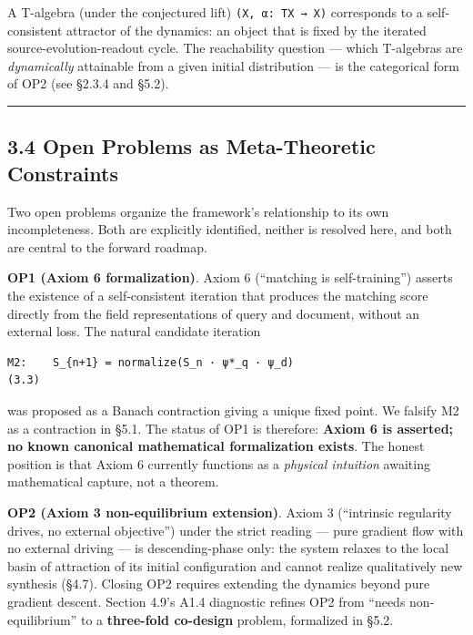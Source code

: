 \documentclass[
]{article}
\begin{document}
A T-algebra (under the conjectured lift) \texttt{(X,\ α:\ TX\ →\ X)}
corresponds to a self-consistent attractor of the dynamics: an object
that is fixed by the iterated source-evolution-readout cycle. The
reachability question --- which T-algebras are \emph{dynamically}
attainable from a given initial distribution --- is the categorical form
of OP2 (see §2.3.4 and §5.2).

\begin{center}\rule{0.5\linewidth}{0.5pt}\end{center}

\hypertarget{open-problems-as-meta-theoretic-constraints}{%
\subsection{3.4 Open Problems as Meta-Theoretic
Constraints}\label{open-problems-as-meta-theoretic-constraints}}

Two open problems organize the framework's relationship to its own
incompleteness. Both are explicitly identified, neither is resolved
here, and both are central to the forward roadmap.

\textbf{OP1 (Axiom 6 formalization)}. Axiom 6 (``matching is
self-training'') asserts the existence of a self-consistent iteration
that produces the matching score directly from the field representations
of query and document, without an external loss. The natural candidate
iteration

\begin{verbatim}
M2:    S_{n+1} = normalize(S_n · ψ*_q · ψ_d)                                (3.3)
\end{verbatim}

was proposed as a Banach contraction giving a unique fixed point. We
falsify M2 as a contraction in §5.1. The status of OP1 is therefore:
\textbf{Axiom 6 is asserted; no known canonical mathematical
formalization exists}. The honest position is that Axiom 6 currently
functions as a \emph{physical intuition} awaiting mathematical capture,
not a theorem.

\textbf{OP2 (Axiom 3 non-equilibrium extension)}. Axiom 3 (``intrinsic
regularity drives, no external objective'') under the strict reading ---
pure gradient flow with no external driving --- is descending-phase
only: the system relaxes to the local basin of attraction of its initial
configuration and cannot realize qualitatively new synthesis (§4.7).
Closing OP2 requires extending the dynamics beyond pure gradient
descent. Section 4.9's A1.4 diagnostic refines OP2 from ``needs
non-equilibrium'' to a \textbf{three-fold co-design} problem, formalized
in §5.2.
\end{document}
